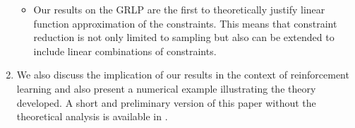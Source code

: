 \begin{enumerate}
\begin{itemize}
		\item Our results on the GRLP are the first to theoretically justify linear function approximation of the constraints. This means that constraint reduction is not only limited to sampling but also can be extended to include linear combinations of constraints.
	\end{itemize}
\item We also discuss the implication of our results in the context of reinforcement learning and also present a numerical example illustrating the theory developed. A short and preliminary version of this paper without the theoretical analysis is available in \cite{aaaipaper}.
\end{enumerate}

